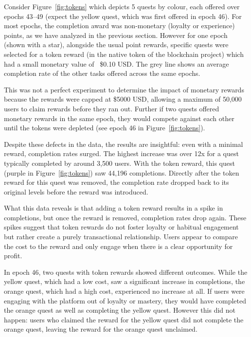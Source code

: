 Consider Figure~\ref{fig:tokens} which depicts 5 quests by colour, each offered over epochs 43--49 (expect the yellow quest, which was first offered in epoch 46). For most epochs, the completion award was non-monetary (loyalty or experience) points, as we have analyzed in the previous section. However for one epoch (shown with a star), alongside the usual point rewards, specific quests were selected for a token reward (in the native token of the blockchain project) which had a small monetary value of ~\$0.10 USD. The grey line shows an average completion rate of the other tasks offered across the same epochs.

This was not a perfect experiment to determine the impact of monetary rewards because the rewards were capped at \$5000 USD, allowing a maximum of 50,000 users to claim rewards before they ran out. Further if two quests offered monetary rewards in the same epoch, they would compete against each other until the tokens were depleted (see epoch 46 in Figure~\ref{fig:tokens}).

Despite these defects in the data, the results are insightful: even with a minimal reward, completion rates surged. The highest increase was over 12x for a quest typically completed by around 3,500 users. With the token reward, this quest (purple in Figure~\ref{fig:tokens}) saw 44,196 completions. Directly after the token reward for this quest was removed, the completion rate dropped back to its original levels before the reward was introduced. 

What this data reveals is that adding a token reward results in a spike in completions, but once the reward is removed, completion rates drop again. These spikes suggest that token rewards do not foster loyalty or habitual engagement but rather create a purely transactional relationship. Users appear to compare the cost to the reward and only engage when there is a clear opportunity for profit.

In epoch 46, two quests with token rewards showed different outcomes. While the yellow quest, which had a low cost, saw a significant increase in completions, the orange quest, which had a high cost, experienced no increase at all. If users were engaging with the platform out of loyalty or mastery, they would have completed the orange quest as well as completing the yellow quest. However this did not happen: users who claimed the reward for the yellow quest did not complete the orange quest, leaving the reward for the orange quest unclaimed.


